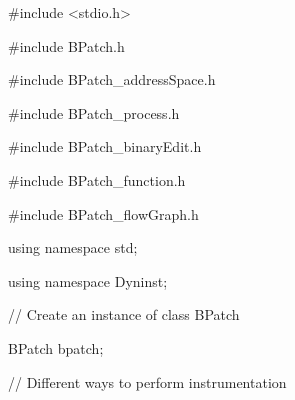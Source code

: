 {

\#include <stdio.h>}





\bigskip



{

\#include {\textquotedbl}BPatch.h{\textquotedbl}}



{

\#include {\textquotedbl}BPatch_addressSpace.h{\textquotedbl}}



{

\#include {\textquotedbl}BPatch_process.h{\textquotedbl}}



{

\#include {\textquotedbl}BPatch_binaryEdit.h{\textquotedbl}}



{

\#include {\textquotedbl}BPatch_function.h{\textquotedbl}}



{

\#include {\textquotedbl}BPatch_flowGraph.h{\textquotedbl}}





\bigskip



{

using namespace std;}



{

using namespace Dyninst;}





\bigskip



{

// Create an instance of class BPatch}



{

BPatch bpatch;}





\bigskip



{

// Different ways to perform instrumentation}



